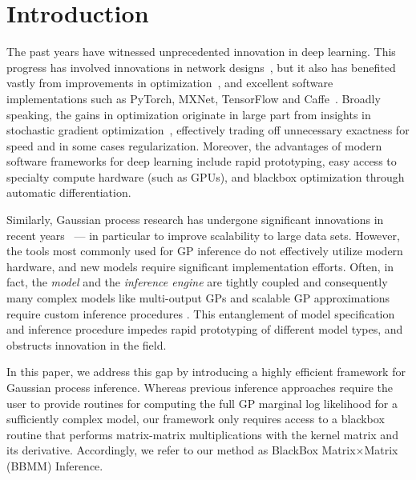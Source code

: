 \section{Introduction}
The past years have witnessed unprecedented innovation in deep learning. This progress has involved innovations in network designs~\cite{alexnet,hahnloser2000digital,he2016deep,huang2017densely,batchnorm}, but it also has benefited vastly from improvements in optimization~\cite{bottou2010large}, and excellent software implementations such as PyTorch, MXNet, TensorFlow and Caffe~\cite{paszke2017automatic,chen2015mxnet,abadi2016tensorflow,jia2014caffe}. Broadly speaking, the gains in optimization originate in large part from insights in stochastic gradient optimization~\citep{bottou2010large, krizhevsky2012imagenet, chaudhari2016entropy, hochreiter1997flat, keskar2016large, izmailov2018averaging}, effectively trading off unnecessary exactness for speed and in some cases regularization. Moreover, the advantages of modern software frameworks for deep learning include rapid prototyping, easy access to specialty compute hardware (such as GPUs), and blackbox optimization through automatic differentiation.

Similarly, Gaussian process research has undergone significant innovations in recent years~\cite{titsias2009variational,hensman2013gaussian,wilson2014thesis,wilson2015kernel,wilson2015thoughts,cunningham2008fast} --- in particular to improve scalability to large data sets. However,
the tools most commonly used for GP inference do not effectively utilize modern hardware, and new models require significant implementation efforts. Often, in fact, the \emph{model} and the \emph{inference engine} are tightly coupled and consequently many complex models like multi-output GPs and scalable GP approximations require custom inference procedures \cite{hensman2015scalable,bonilla2008multi}. This entanglement of model specification and inference procedure impedes rapid prototyping of different model types, and obstructs innovation in the field.

In this paper, we address this gap by introducing a highly efficient framework for Gaussian process inference.
Whereas previous inference approaches require the user to provide routines for computing the full GP marginal log likelihood for a sufficiently complex model,
our framework only requires access to a blackbox routine that performs matrix-matrix multiplications with the kernel matrix and its derivative.
Accordingly, we refer to our method as BlackBox Matrix$\times$Matrix (BBMM) Inference.

